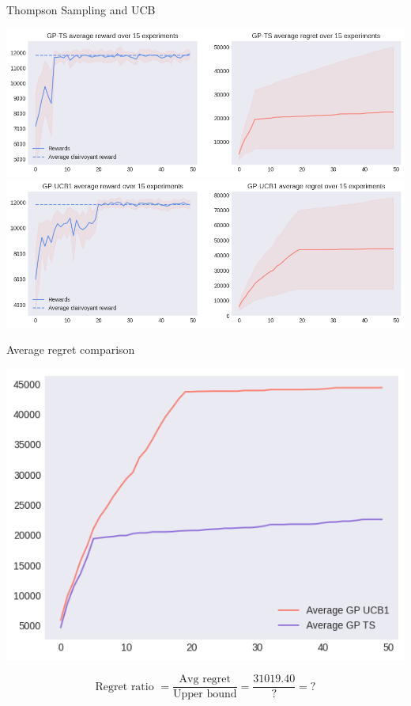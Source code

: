 Thompson Sampling and UCB

\begin{center}
	\includegraphics[scale=0.4]{img/Graphs/uncertain_alpha/image4.png}
	\includegraphics[scale=0.4]{img/Graphs/uncertain_alpha/image5.png}
\end{center}

Average regret comparison

\begin{center}
	\includegraphics[scale=0.45]{img/Graphs/uncertain_alpha/image6.png}
\end{center}

\begin{displaymath}
	\text{Regret ratio } = \frac{\text{Avg regret}}{\text{Upper bound}} = \frac{31019.40}{?} = ?
\end{displaymath}

